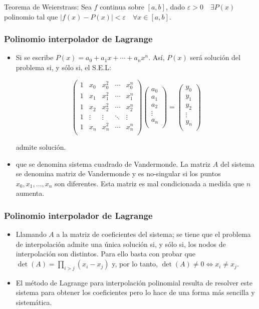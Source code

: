 \documentclass{beamer}
\begin{document}
\frame
{
\begin{block}{Teorema de Weierstrass:}
Sea $f$ continua sobre $[a,b]$, dado $\varepsilon > 0 \quad \exists P(x)$ polinomio tal que $\mid f(x)-P(x)\mid < \varepsilon \quad \forall x\in [a,b]$.
\end{block}
}
\frame
{
\frametitle{Polinomio interpolador de Lagrange}
\begin{itemize}
\item Si se escribe $P(x) = a_0 + a_1x + \cdots + a_nx^n$. As\'i, $P(x)$ ser\'a soluci\'on del problema si, y s\'olo si, el S.E.L:
\begin{block}{}
$$
\left(
\begin{array}{ccccc}
 1 & x_0 & x_0^2 & \cdots & x_0^n\\
 1 & x_1 & x_1^2 & \cdots & x_1^n\\
 1 & x_2 & x_2^2 & \cdots & x_2^n\\
 1 & \vdots & \vdots & \ddots & \vdots\\
 1 & x_n & x_n^2 & \cdots & x_n^n\\
\end{array}\right)
\left(
\begin{array}{c}
 a_0\\
 a_1\\
 a_2\\
 \vdots\\
 a_n\\
\end{array}\right) =
\left(
\begin{array}{c}
 y_0\\
 y_1\\
 y_2\\
 \vdots\\
 y_n\\
\end{array}
\right)
$$
\end{block}
admite soluci\'on.

\item<2-> que se denomina sistema cuadrado de Vandermonde. La matriz $A$ del sistema se denomina matriz de Vandermonde y es no-singular si los puntos $x_0, x_1, \ldots , x_n$ son diferentes. Esta matriz es mal condicionada a medida que $n$ aumenta.
\end{itemize}
}
\begin{frame}
  \frametitle{Polinomio interpolador de Lagrange}
  \begin{itemize}
    \item Llamando $A$ a la matriz de coeficientes del sistema; se tiene que el problema de interpolaci\'on admite una \'unica soluci\'on si, y s\'olo si, los nodos de interpolaci\'on son distintos. Para ello basta con probar que $\det(A) = \prod_{i>j}(x_i-x_j)$ y, por lo tanto, $\det(A) \neq 0 \Leftrightarrow x_i \neq x_j$.
    \item<2-> El m\'etodo de Lagrange para interpolaci\'on polinomial resulta de resolver este sistema para obtener los coeficientes pero lo hace de una forma m\'as sencilla y sistem\'atica. 
  \end{itemize}
\end{frame}
\end{document}
